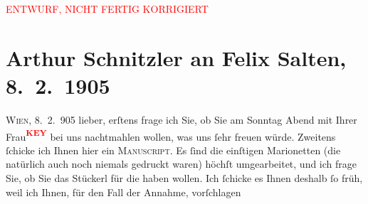 
\begin{center}
            \textcolor{red}{ENTWURF, NICHT FERTIG KORRIGIERT}
                      \end{center}
            
         
         \renewcommand{\erwaehntePersonen}{Personen: Felix Salten}
         \renewcommand{\erwaehnteOrte}{Orte: Wien}
         \renewcommand{\erwaehnteWerke}{Werke: Die Zeit, Zum großen Wurstel}
               \section[Arthur Schnitzler an Felix Salten, 8. 2. 1905]{ Arthur Schnitzler an Felix Salten, 8. 2. 1905}\nopagebreak{}\rehead{ }\begin{ledgroupsized}[t]{13cm}\normalsize\beginnumbering \toendnotes[C]{\smallbreak\pagebreak[2]} 
\toendnotes[C]{\smallbreak}\pstart
           \raggedleft{}\textsc{{\pb}Wien}, 8. 2. 905\pend
           \pstart{}lieber,\pend\pstart
           erſtens frage ich Sie, ob Sie am Sonntag Abend mit Ihrer Frau\textcolor{red}{\textsuperscript{\textbf{KEY}}} bei uns nachtmahlen wollen, was
               uns ſehr freuen würde. \pend
           \pstart
           Zweitens ſchicke ich Ihnen hier ein \textsc{Manuscript}. Es ſind die einſtigen Marionetten (die natürlich
               auch noch niemals gedruckt waren) höchſt umgearbeitet, und ich frage Sie, ob Sie das
               Stückerl für die \label{K_L02997-1v}\label{K_L02997-1h} haben wollen. Ich ſchicke es
               Ihnen deshalb ſo früh, weil ich Ihnen, für {\pb}den Fall der Annahme, vorſchlagen

\end{ledgroupsized}
